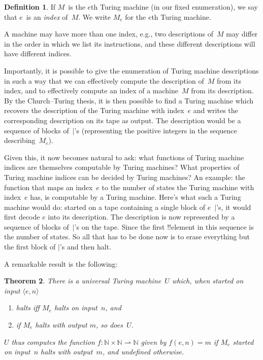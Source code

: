\documentclass[10pt,a4paper]{article}
\theoremstyle{plain}
\newtheorem{thm}{Theorem}[section]
\theoremstyle{definition}
\newtheorem{defn}[thm]{Definition}
\theoremstyle{remark}
\newcommand*{\ollabel}[1]{\label{#1}}
\providecommand{\tuple}[1]{\langle #1 \rangle}
\providecommand{\Nat}{\ensuremath{\mathbb{N}}}
\providecommand{\pto}{\rightharpoonup}
\providecommand{\TMstroke}{\mid}
\begin{document}
\begin{defn}
If $M$~is the $e$th Turing machine (in our fixed enumeration), we
say that $e$~is an \emph{index} of~$M$. We write $M_e$ for the $e$th
Turing machine.
\end{defn}

A machine may have more than one index, e.g., two descriptions of~$M$
may differ in the order in which we list its instructions, and these
different descriptions will have different indices.

Importantly, it is possible to give the enumeration of Turing machine
descriptions in such a way that we can effectively compute the
description of~$M$ from its index, and to effectively compute an index
of a machine~$M$ from its description.  By the Church--Turing thesis,
it is then possible to find a Turing machine which recovers the
description of the Turing machine with index~$e$ and writes the
corresponding description on its tape as output. The description would
be a sequence of blocks of~$\TMstroke$'s (representing the positive
integers in the sequence describing~$M_e$).

Given this, it now becomes natural to ask: what functions of Turing
machine indices are themselves computable by Turing machines? What
properties of Turing machine indices can be decided by Turing
machines?  An example: the function that maps an index~$e$ to the
number of states the Turing machine with index~$e$ has, is computable
by a Turing machine. Here's what such a Turing machine would do:
started on a tape containing a single block of $e$~$\TMstroke$'s, it
would first decode $e$ into its description. The description is now
represented by a sequence of blocks of~$\TMstroke$'s on the tape.
Since the first !!{element} in this sequence is the number of states.
So all that has to be done now is to erase everything but the first
block of $\TMstroke$'s and then halt.

A remarkable result is the following:

\begin{thm}\ollabel{thm:universal-tm} There is a \emph{universal
  Turing machine}~$U$ which, when started on input $\tuple{e,n}$ 
  \begin{enumerate}
    \item halts iff $M_e$ halts on input~$n$, and
    \item if $M_e$ halts with output $m$, so does~$U$.
  \end{enumerate}
  $U$ thus computes the function $f\colon \Nat \times \Nat \pto \Nat$
  given by $f(e,n) = m$ if $M_e$ started on input~$n$ halts with
  output~$m$, and undefined otherwise.
\end{thm}
\end{document}
